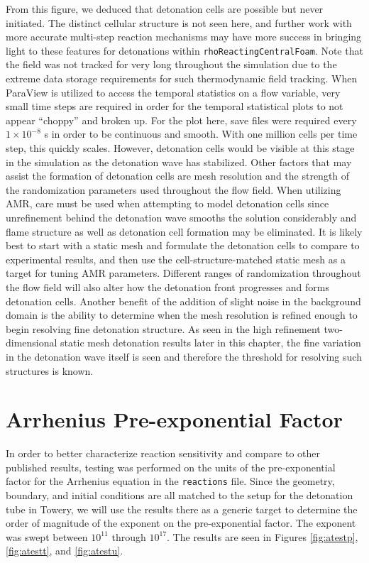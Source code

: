 From this figure, we deduced that detonation cells are possible but never initiated. The distinct cellular structure is not seen here, and further work with more accurate multi-step reaction mechanisms may have more success in bringing light to these features for detonations within \verb|rhoReactingCentralFoam|. Note that the field was not tracked for very long throughout the simulation due to the extreme data storage requirements for such thermodynamic field tracking. When ParaView is utilized to access the temporal statistics on a flow variable, very small time steps are required in order for the temporal statistical plots to not appear ``choppy'' and broken up. For the plot here, save files were required every \(1 \times 10^{ - 8}\) s in order to be continuous and smooth. With one million cells per time step, this quickly scales. However, detonation cells would be visible at this stage in the simulation as the detonation wave has stabilized. Other factors that may assist the formation of detonation cells are mesh resolution and the strength of the randomization parameters used throughout the flow field. When utilizing AMR, care must be used when attempting to model detonation cells since unrefinement behind the detonation wave smooths the solution considerably and flame structure as well as detonation cell formation may be eliminated. It is likely best to start with a static mesh and formulate the detonation cells to compare to experimental results, and then use the cell-structure-matched static mesh as a target for tuning AMR parameters. Different ranges of randomization throughout the flow field will also alter how the detonation front progresses and forms detonation cells. Another benefit of the addition of slight noise in the background domain is the ability to determine when the mesh resolution is refined enough to begin resolving fine detonation structure. As seen in the high refinement two-dimensional static mesh detonation results later in this chapter, the fine variation in the detonation wave itself is seen and therefore the threshold for resolving such structures is known. 



\section{Arrhenius Pre-exponential Factor}
\label{sec:a}

In order to better characterize reaction sensitivity and compare to other published results, testing was performed on the units of the pre-exponential factor for the Arrhenius equation in the \verb|reactions| file. Since the geometry, boundary, and initial conditions are all matched to the setup for the detonation tube in Towery\cite{towery1}, we will use the results there as a generic target to determine the order of magnitude of the exponent on the pre-exponential factor. The exponent was swept between \(10^{11}\) through \(10^{17}\). The results are seen in Figures \ref{fig:atestp}, \ref{fig:atestt}, and \ref{fig:atestu}. 

